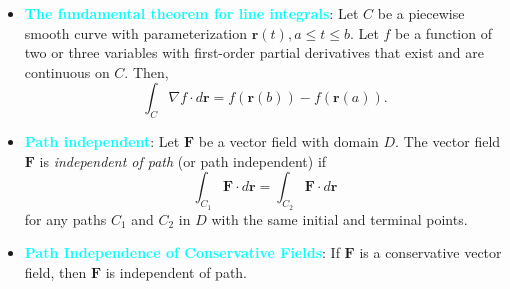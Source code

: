 \documentclass{report}
\begin{document}
\begin{itemize}
        \item \textbf{\textcolor{cyan}{The fundamental theorem for line integrals}}:
            Let \( C \) be a piecewise smooth curve with parameterization \(\mathbf{r}(t), a \leq t \leq b\).
            \bigbreak \noindent 
            Let \( f \) be a function of two or three variables with first-order partial derivatives that exist and are continuous on \( C \). Then,
            \[
                \int_C \nabla f \cdot d\mathbf{r} = f(\mathbf{r}(b)) - f(\mathbf{r}(a)).
            \]
        \item \textbf{\textcolor{cyan}{Path independent}}:
            Let \( \mathbf{F} \) be a vector field with domain \( D \). The vector field \( \mathbf{F} \) is \textit{independent of path} (or path independent) if 
            \[
                \int_{C_1} \mathbf{F} \cdot d\mathbf{r} = \int_{C_2} \mathbf{F} \cdot d\mathbf{r}
            \]
            for any paths \( C_1 \) and \( C_2 \) in \( D \) with the same initial and terminal points.
        \item \textbf{\textcolor{cyan}{Path Independence of Conservative Fields}}:
            If $\mathbf{F}$ is a conservative vector field, then $\mathbf{F}$ is independent of path.


\end{itemize}
\end{document}
